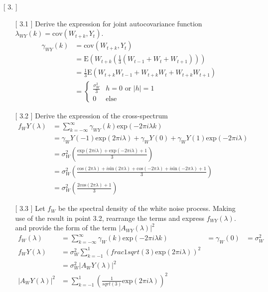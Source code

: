 \documentclass[10pt,a4paper]{article}
\begin{document}
\begin{enumerate}
	\item[[ 3.]]  \begin{enumerate}
		\item[[ 3.1]] Derive the expression for joint autocovariance function $\lambda_{WY}(k) = \text{cov}(W_{t+k},Y_t)$.
		\begin{align*}
			\gamma_{WY}(k) &= \text{cov}(W_{t+k},Y_t) \\
			&= \text{E}(W_{t+k}(\frac{1}{3}(W_{t-1}+W_{t}+W_{t+1}))) \\
			&= \frac{1}{3} \text{E}(W_{t+k}W_{t-1}+W_{t+k}W_{t}+W_{t+k}W_{t+1}) \\
			&=  	\left\{
			\begin{array}{ll}
				\frac{\sigma_{W}^2}{3} & h=0 \text{  or  } |h| = 1\\
				0 & \text{else}
			\end{array}
			\right.
		\end{align*}
		\item[[ 3.2]] Derive the expression of the cross-spectrum
		\begin{align*}
			f_WY(\lambda) &= \sum_{k=-\infty}^{\infty} \gamma_{WY}(k) \text{exp}(-2\pi i \lambda k) \\
			&= \gamma_WY(-1) \text{exp}(2\pi i \lambda) + \gamma_WY(0) + \gamma_WY(1) \text{exp}(-2\pi i \lambda) \\
			&= \sigma_{W}^2 \left( \frac{\text{exp}(2\pi i \lambda) + \text{exp}(-2\pi i \lambda) + 1}{3}\right) \\
			&= \sigma_{W}^2 \left(\frac{\text{cos}(2\pi \lambda) + i\text{sin}(2\pi \lambda) +\text{cos}(-2\pi \lambda) + i\text{sin}(-2\pi \lambda) + 1}{3}\right) \\
			&= \sigma_{W}^2 \left(\frac{2\text{cos}(2\pi \lambda) + 1}{3}\right)
		\end{align*}
		\item[[ 3.3]] Let $f_W$ be the spectral density of the white noise process. Making use of the result in point 3.2, rearrange the terms and express $f_{WY}(\lambda).$ and provide the form of the term $|A_{WY}(\lambda)|^2$
		\begin{align*}
		f_W(\lambda) &= \sum_{k=-\infty}^{\infty} \gamma_{W}(k) \text{exp}(-2\pi i \lambda k) &= \gamma_{W}(0) &= \sigma_{W}^2\\
			f_WY(\lambda) &= \sigma_{W}^2 \sum_{k=-1}^{1} (frac{1}{sqrt(3)} \text{exp}(2\pi i \lambda))^2 \\
			&= \sigma_{W}^2 |A_WY(\lambda)|^2 \\
			|A_WY(\lambda)|^2 &= \sum_{k=-1}^{1} (\frac{1}{sqrt(3)} \text{exp}(2\pi i \lambda))^2 \\

\end{align*}
\end{enumerate}
\end{enumerate}
\end{document}
